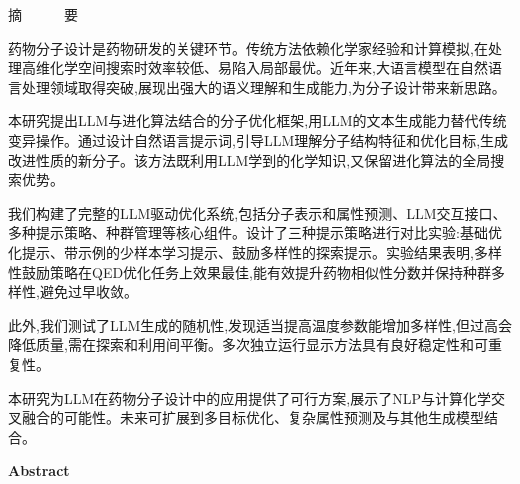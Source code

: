 \begin{center}
    {\heiti\sizeThree 摘~~~~~~要}
\end{center}

\vspace{0.5cm}

\begin{center}
    {\heiti\sizeThreel \thesisTitle}
\end{center}

\vspace{0.5cm}

药物分子设计是药物研发的关键环节。传统方法依赖化学家经验和计算模拟,在处理高维化学空间搜索时效率较低、易陷入局部最优。近年来,大语言模型在自然语言处理领域取得突破,展现出强大的语义理解和生成能力,为分子设计带来新思路。

本研究提出LLM与进化算法结合的分子优化框架,用LLM的文本生成能力替代传统变异操作。通过设计自然语言提示词,引导LLM理解分子结构特征和优化目标,生成改进性质的新分子。该方法既利用LLM学到的化学知识,又保留进化算法的全局搜索优势。

我们构建了完整的LLM驱动优化系统,包括分子表示和属性预测、LLM交互接口、多种提示策略、种群管理等核心组件。设计了三种提示策略进行对比实验:基础优化提示、带示例的少样本学习提示、鼓励多样性的探索提示。实验结果表明,多样性鼓励策略在QED优化任务上效果最佳,能有效提升药物相似性分数并保持种群多样性,避免过早收敛。

此外,我们测试了LLM生成的随机性,发现适当提高温度参数能增加多样性,但过高会降低质量,需在探索和利用间平衡。多次独立运行显示方法具有良好稳定性和可重复性。

本研究为LLM在药物分子设计中的应用提供了可行方案,展示了NLP与计算化学交叉融合的可能性。未来可扩展到多目标优化、复杂属性预测及与其他生成模型结合。

\vspace{0.75cm}


\newpage

\begin{center}
    {\bfseries\sizeThree Abstract}
\end{center}

\vspace{0.5cm}

\begin{center}
    {\bfseries\sizeThreel \thesisTitleENG}
\end{center}

\vspace{0.5cm}

